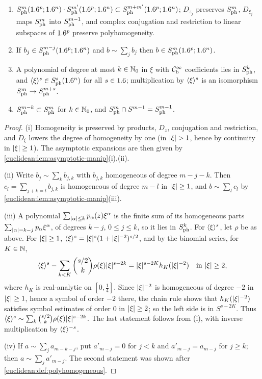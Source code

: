 \begin{lemma}\label{euclidean:lem:ph-basic}
  \begin{enumerate}[label=\textup{(\roman*)}]
  \item $S^{m}_{\mathrm{ph}}(1.6^p;1.6^n)\cdot S^{m'}_{\mathrm{ph}}(1.6^p;1.6^n)\subset S^{m+m'}_{\mathrm{ph}}(1.6^p;1.6^n)$;
    $D_{z_j}$ preserves $S^{m}_{\mathrm{ph}}$, $D_{\xi_j}$ maps $S^{m}_{\mathrm{ph}}$ into
    $S^{m-1}_{\mathrm{ph}}$, and complex conjugation and restriction to linear
    subspaces of $1.6^p$ preserve polyhomogeneity.
  \item If $b_j\in S^{m-j}_{\mathrm{ph}}(1.6^p;1.6^n)$ and $b\sim\sum_jb_j$ then
    $b\in S^{m}_{\mathrm{ph}}(1.6^p;1.6^n)$.
  \item A polynomial of degree at most $k\in\mathbb{N}_0$ in $\xi$ with $\mathcal{C}^\infty_{\mathrm{b}}$ coefficients
    lies in $S^{k}_{\mathrm{ph}}$, and
    $\langle \xi\rangle^s\in S^{s}_{\mathrm{ph}}(1.6^n)$ for all $s\in1.6$; multiplication by
    $\langle \xi\rangle^{s}$ is an isomorphism $S^{m}_{\mathrm{ph}}\to S^{m+s}_{\mathrm{ph}}$.
  \item $S^{m-k}_{\mathrm{ph}}\subset S^{m}_{\mathrm{ph}}$ for $k\in\mathbb{N}_0$, and
    $S^{m}_{\mathrm{ph}}\cap S^{m-1}=S^{m-1}_{\mathrm{ph}}$.
  \end{enumerate}
\end{lemma}
\begin{proof}
  (i) Homogeneity is preserved by products, $D_z$, conjugation and
  restriction, and $D_\xi$ lowers the degree of homogeneity by one (in
  $\lvert \xi\rvert>1$, hence by continuity in $\lvert \xi\rvert\ge1$). The asymptotic
  expansions are then given by \cref{euclidean:lem:asymptotic-manip}(i),(ii).

  (ii) Write $b_j\sim\sum_kb_{j,k}$ with $b_{j,k}$ homogeneous of degree
  $m-j-k$. Then $c_l=\sum_{j+k=l}b_{j,k}$ is homogeneous of degree $m-l$
  in $\lvert \xi\rvert\ge1$, and $b\sim\sum_lc_l$ by
  \cref{euclidean:lem:asymptotic-manip}(iii).

  (iii) A polynomial $\sum_{\lvert \alpha\rvert\le k}p_\alpha(z)\xi^\alpha$ is the finite sum
  of its homogeneous parts $\sum_{\lvert \alpha\rvert=k-j}p_\alpha\xi^\alpha$, of degrees $k-j$,
  $0\le j\le k$, so it lies in $S^{k}_{\mathrm{ph}}$. For $\langle \xi\rangle^s$, let $\rho$ be as above. For
  $\lvert \xi\rvert\ge1$, $\langle \xi\rangle^s=\lvert \xi\rvert^s(1+\lvert \xi\rvert^{-2})^{s/2}$, and by the binomial
  series, for $K\in\mathbb{N}$,
  \begin{equation*}
    \langle \xi\rangle^s-\sum_{k<K}\binom{s/2}k\rho(\xi)\lvert \xi\rvert^{s-2k}
    =\lvert \xi\rvert^{s-2K}h_K(\lvert \xi\rvert^{-2})\quad\text{in }\lvert \xi\rvert\ge2,
  \end{equation*}
  where $h_K$ is real-analytic on $[0,\frac14]$. Since $\lvert \xi\rvert^{-2}$ is
  homogeneous of degree $-2$ in $\lvert \xi\rvert\ge1$, hence a symbol of order $-2$
  there, the chain rule shows that $h_K(\lvert \xi\rvert^{-2})$ satisfies symbol
  estimates of order $0$ in $\lvert \xi\rvert\ge2$; so the left side is in
  $S^{s-2K}$. Thus $\langle \xi\rangle^s\sim\sum_k\binom{s/2}k\rho(\xi)\lvert \xi\rvert^{s-2k}$. The
  last statement follows from (i), with inverse multiplication by $\langle \xi\rangle^{-s}$.

  (iv) If $a\sim\sum_ja_{m-k-j}$, put $a'_{m-j}=0$ for $j<k$ and
  $a'_{m-j}=a_{m-j}$ for $j\ge k$; then $a\sim\sum_ja'_{m-j}$. The second
  statement was shown after \cref{euclidean:def:polyhomogeneous}.
\end{proof}


